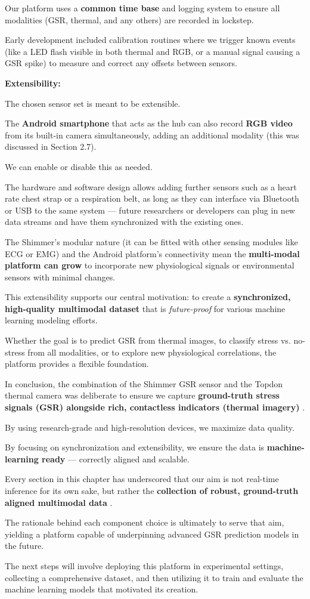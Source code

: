 Our platform uses a \textbf{common time base}
 and logging system to ensure all modalities (GSR, thermal, and any others) are recorded in lockstep.

Early development included calibration routines where we trigger known events (like a LED flash visible in both thermal and RGB, or a manual signal causing a GSR spike) to measure and correct any offsets between sensors.

\textbf{Extensibility:}

The chosen sensor set is meant to be extensible.

The \textbf{Android smartphone}
 that acts as the hub can also record \textbf{RGB video}
 from its built-in camera simultaneously, adding an additional modality (this was discussed in Section 2.7).

We can enable or disable this as needed.

The hardware and software design allows adding further sensors such as a heart rate chest strap or a respiration belt, as long as they can interface via Bluetooth or USB to the same system --- future researchers or developers can plug in new data streams and have them synchronized with the existing ones.

The Shimmer's modular nature (it can be fitted with other sensing modules like ECG or EMG) and the Android platform's connectivity mean the \textbf{multi-modal platform can grow}
 to incorporate new physiological signals or environmental sensors with minimal changes.

This extensibility supports our central motivation: to create a \textbf{synchronized, high-quality multimodal dataset}
 that is \textit{future-proof} for various machine learning modeling efforts.

Whether the goal is to predict GSR from thermal images, to classify stress vs. no-stress from all modalities, or to explore new physiological correlations, the platform provides a flexible foundation.

In conclusion, the combination of the Shimmer GSR sensor and the Topdon thermal camera was deliberate to ensure we capture \textbf{ground-truth stress signals (GSR) alongside rich, contactless indicators (thermal imagery)}
.

By using research-grade and high-resolution devices, we maximize data quality.

By focusing on synchronization and extensibility, we ensure the data is \textbf{machine-learning ready}
 --- correctly aligned and scalable.

Every section in this chapter has underscored that our aim is not real-time inference for its own sake, but rather the \textbf{collection of robust, ground-truth aligned multimodal data}
.

The rationale behind each component choice is ultimately to serve that aim, yielding a platform capable of underpinning advanced GSR prediction models in the future.

The next steps will involve deploying this platform in experimental settings, collecting a comprehensive dataset, and then utilizing it to train and evaluate the machine learning models that motivated its creation.
